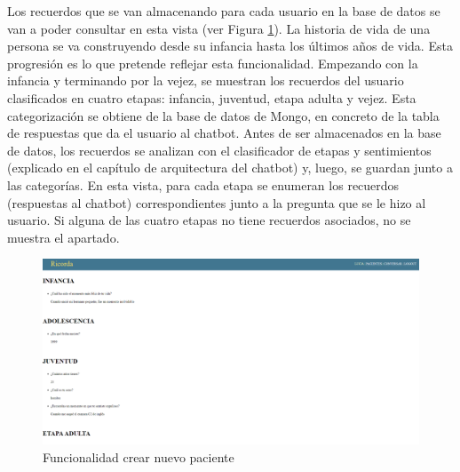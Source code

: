 Los recuerdos que se van almacenando para cada usuario en la base de datos se van a poder consultar en esta vista (ver Figura \ref{fig:funcionalidadhistoriavida}). La historia de vida de una persona se va construyendo desde su infancia hasta los últimos años de vida. Esta progresión es lo que pretende reflejar esta funcionalidad. Empezando con la infancia y terminando por la vejez, se muestran los recuerdos del usuario clasificados en cuatro etapas: infancia, juventud, etapa adulta y vejez. Esta categorización se obtiene de la base de datos de Mongo, en concreto de la tabla de respuestas que da el usuario al chatbot. Antes de ser almacenados en la base de datos, los recuerdos se analizan con el clasificador de etapas y sentimientos (explicado en el capítulo de arquitectura del chatbot) y, luego, se guardan junto a las categorías. En esta vista, para cada etapa se enumeran los recuerdos (respuestas al chatbot) correspondientes junto a la pregunta que se le hizo al usuario. Si alguna de las cuatro etapas no tiene recuerdos asociados, no se muestra el apartado. 

\begin{figure}[h]
	\centering
	\includegraphics[scale=0.3]{Imagenes/Vectorial/funcionalidad_historia_vida}
	\caption{Funcionalidad crear nuevo paciente}
	\label{fig:funcionalidadhistoriavida}
\end{figure}




